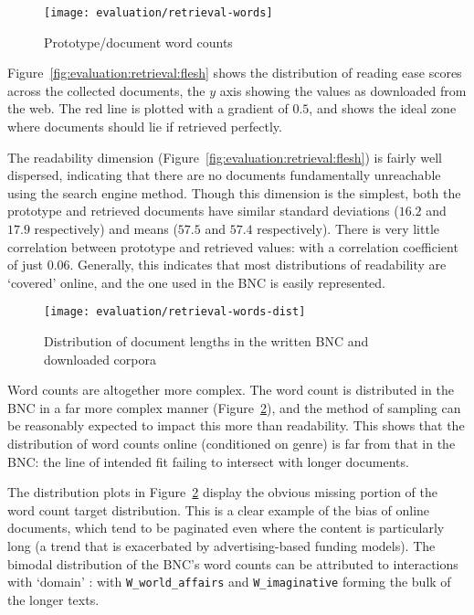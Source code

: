 \begin{figure}[Ht]
    \centering
    \texttt{[image: evaluation/retrieval-words]}
    \caption{Prototype/document word counts}
    \label{fig:evaluation:retrieval:words}
\end{figure}

Figure~\ref{fig:evaluation:retrieval:flesh} shows the distribution of reading ease scores across the collected documents, the $y$ axis showing the values as downloaded from the web.  The red line is plotted with a gradient of $0.5$, and shows the ideal zone where documents should lie if retrieved perfectly.


The readability dimension (Figure~\ref{fig:evaluation:retrieval:flesh}) is fairly well dispersed, indicating that there are no documents fundamentally unreachable using the search engine method.  Though this dimension is the simplest, both the prototype and retrieved documents have similar standard deviations ($16.2$ and $17.9$ respectively) and means ($57.5$ and $57.4$ respectively).  There is very little correlation between prototype and retrieved values: with a correlation coefficient of just $0.06$.  Generally, this indicates that most distributions of readability are `covered' online, and the one used in the BNC is easily represented.

\begin{figure}[Ht]
    \centering
    \texttt{[image: evaluation/retrieval-words-dist]}
    \caption{Distribution of document lengths in the written BNC and downloaded corpora}
    \label{fig:evaluation:retrieval:words-dist}
\end{figure}

Word counts are altogether more complex.  The word count is distributed in the BNC in a far more complex manner (Figure~\ref{fig:evaluation:retrieval:words-dist}), and the method of sampling can be reasonably expected to impact this more than readability.  This shows that the distribution of word counts online (conditioned on genre) is far from that in the BNC: the line of intended fit failing to intersect with longer documents.

The distribution plots in Figure~\ref{fig:evaluation:retrieval:words-dist} display the obvious missing portion of the word count target distribution.  This is a clear example of the bias of online documents, which tend to be paginated even where the content is particularly long (a trend that is exacerbated by advertising-based funding models).  The bimodal distribution of the BNC's word counts can be attributed to interactions with `domain'%
: with \texttt{W\_world\_affairs} and \texttt{W\_imaginative} forming the bulk of the longer texts.

